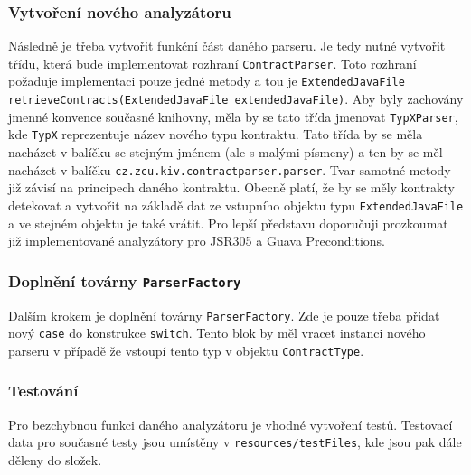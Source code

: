 	    	\subsubsection{Vytvoření nového analyzátoru}
	    		Následně je třeba vytvořit funkční část daného parseru. Je tedy nutné vytvořit třídu, která bude implementovat rozhraní \texttt{ContractParser}. Toto rozhraní požaduje implementaci pouze jedné metody a tou je \texttt{ExtendedJavaFile retrieveContracts(ExtendedJavaFile extendedJavaFile)}. Aby byly zachovány jmenné konvence současné knihovny, měla by se tato třída jmenovat \texttt{TypXParser}, kde \texttt{TypX} reprezentuje název nového typu kontraktu. Tato třída by se měla nacházet v balíčku se stejným jménem (ale s malými písmeny) a ten by se měl nacházet v balíčku \texttt{cz.zcu.kiv.contractparser.parser}. Tvar samotné metody již závisí na principech daného kontraktu. Obecně platí, že by se měly kontrakty detekovat a vytvořit na základě dat ze vstupního objektu typu \texttt{ExtendedJavaFile} a ve stejném objektu je také vrátit. Pro lepší představu doporučuji prozkoumat již implementované analyzátory pro JSR305 a Guava Preconditions.
	    		
	    	\subsubsection{Doplnění továrny \texttt{ParserFactory}} 
	    		Dalším krokem je doplnění továrny \texttt{ParserFactory}. Zde je pouze třeba přidat nový \texttt{case} do konstrukce \texttt{switch}. Tento blok by měl vracet instanci nového parseru v případě že vstoupí tento typ v objektu \texttt{ContractType}.
	    			
	    	\subsubsection{Testování}
	    		Pro bezchybnou funkci daného analyzátoru je vhodné vytvoření testů. Testovací data pro současné testy jsou umístěny v \texttt{resources/testFiles}, kde jsou pak dále děleny do složek.

    
    
    
    
